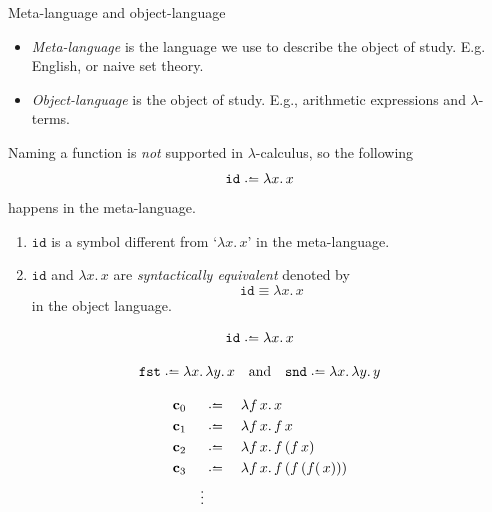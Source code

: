\begin{frame}{Meta-language and object-language}
  \begin{itemize}
    \item \emph{Meta-language} is the language we use to describe the object of
      study. E.g. English, or naive set theory. 
    \item \emph{Object-language} is the object of study. E.g., arithmetic
      expressions and $\lambda$-terms.
  \end{itemize}
  Naming a function is \emph{not} supported in $\lambda$-calculus, so
  the following
    \[
      \mathtt{id} \defeq \lambda x.\, x
    \]
  happens in the meta-language. 
  \begin{enumerate}
    \item $\mathtt{id}$ is a symbol different from `$\lambda x.\,x$' in the meta-language.
    \item $\mathtt{id}$ and $\lambda x.\, x$ are \emph{syntactically equivalent} denoted by
      \[
        \mathtt{id} \equiv \lambda x.\, x
      \]
      in the object language.
  \end{enumerate}
\end{frame}

\begin{frame}
  \begin{example}
    \[
      \mathtt{id} \defeq \lambda x.\, x
    \]
  \end{example}

  \begin{example}[Projections]
    \[
      \mathtt{fst} \defeq \lambda x.\, \lambda y.\, x
      \quad\text{and}\quad \mathtt{snd} \defeq \lambda x.\, \lambda y.\, y
    \]
  \end{example}
  \begin{example}
    \begin{align*}
      &\bc_{0}   &&\defeq \;&& \lambda f\,x.\, x \\
      &\bc_{1} &&\defeq \;&& \lambda f\,x.\, f\,x \\
      &\bc_{2} &&\defeq \;&& \lambda f\,x.\, f\,(f\,x) \\
      &\bc_{3} &&\defeq \;&& \lambda f\,x.\, f\,(f\,(f(\,x))) \\
      && \vdots 
    \end{align*}
  \end{example}
\end{frame}

